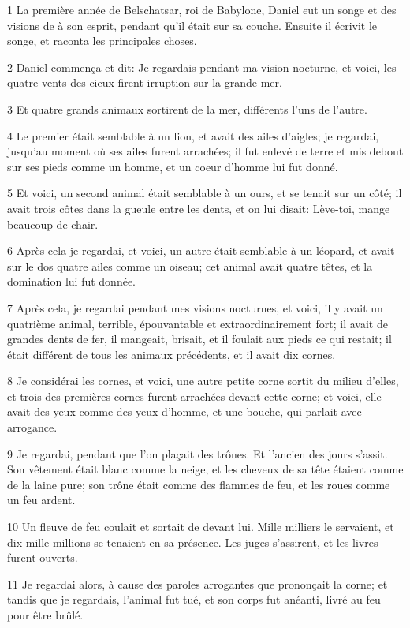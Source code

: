 \par 1 La première année de Belschatsar, roi de Babylone, Daniel eut un songe et des visions de à son esprit, pendant qu'il était sur sa couche. Ensuite il écrivit le songe, et raconta les principales choses.
\par 2 Daniel commença et dit: Je regardais pendant ma vision nocturne, et voici, les quatre vents des cieux firent irruption sur la grande mer.
\par 3 Et quatre grands animaux sortirent de la mer, différents l'uns de l'autre.
\par 4 Le premier était semblable à un lion, et avait des ailes d'aigles; je regardai, jusqu'au moment où ses ailes furent arrachées; il fut enlevé de terre et mis debout sur ses pieds comme un homme, et un coeur d'homme lui fut donné.
\par 5 Et voici, un second animal était semblable à un ours, et se tenait sur un côté; il avait trois côtes dans la gueule entre les dents, et on lui disait: Lève-toi, mange beaucoup de chair.
\par 6 Après cela je regardai, et voici, un autre était semblable à un léopard, et avait sur le dos quatre ailes comme un oiseau; cet animal avait quatre têtes, et la domination lui fut donnée.
\par 7 Après cela, je regardai pendant mes visions nocturnes, et voici, il y avait un quatrième animal, terrible, épouvantable et extraordinairement fort; il avait de grandes dents de fer, il mangeait, brisait, et il foulait aux pieds ce qui restait; il était différent de tous les animaux précédents, et il avait dix cornes.
\par 8 Je considérai les cornes, et voici, une autre petite corne sortit du milieu d'elles, et trois des premières cornes furent arrachées devant cette corne; et voici, elle avait des yeux comme des yeux d'homme, et une bouche, qui parlait avec arrogance.
\par 9 Je regardai, pendant que l'on plaçait des trônes. Et l'ancien des jours s'assit. Son vêtement était blanc comme la neige, et les cheveux de sa tête étaient comme de la laine pure; son trône était comme des flammes de feu, et les roues comme un feu ardent.
\par 10 Un fleuve de feu coulait et sortait de devant lui. Mille milliers le servaient, et dix mille millions se tenaient en sa présence. Les juges s'assirent, et les livres furent ouverts.
\par 11 Je regardai alors, à cause des paroles arrogantes que prononçait la corne; et tandis que je regardais, l'animal fut tué, et son corps fut anéanti, livré au feu pour être brûlé.
